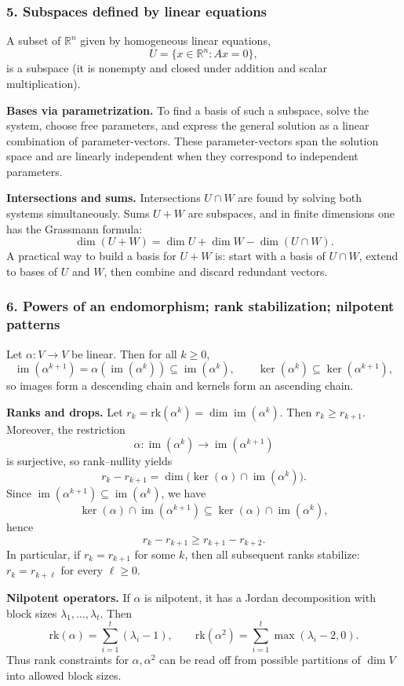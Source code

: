 \documentclass[12pt,a4paper]{article}
\theoremstyle{plain}
\theoremstyle{definition}      %
\begin{document}
\bigskip

\subsubsection*{5. Subspaces defined by linear equations}

A subset of $\mathbb R^n$ given by homogeneous linear equations,
\[
U=\{x\in\mathbb R^n:Ax=0\},
\]
is a subspace (it is nonempty and closed under addition and scalar multiplication).

\medskip
\noindent\textbf{Bases via parametrization.}
To find a basis of such a subspace, solve the system, choose free parameters, and express the general solution as
a linear combination of parameter-vectors. These parameter-vectors span the solution space and are linearly independent
when they correspond to independent parameters.

\medskip
\noindent\textbf{Intersections and sums.}
Intersections $U\cap W$ are found by solving both systems simultaneously. Sums $U+W$ are subspaces, and in finite
dimensions one has the Grassmann formula:
\[
\dim(U+W)=\dim U+\dim W-\dim(U\cap W).
\]
A practical way to build a basis for $U+W$ is: start with a basis of $U\cap W$, extend to bases of $U$ and $W$, then
combine and discard redundant vectors.

\bigskip

\subsubsection*{6. Powers of an endomorphism; rank stabilization; nilpotent patterns}

Let $\alpha:V\to V$ be linear. Then for all $k\ge 0$,
\[
\operatorname{im}(\alpha^{k+1})=\alpha(\operatorname{im}(\alpha^k))\subseteq \operatorname{im}(\alpha^k),
\qquad
\ker(\alpha^k)\subseteq \ker(\alpha^{k+1}),
\]
so images form a descending chain and kernels form an ascending chain.

\medskip
\noindent\textbf{Ranks and drops.}
Let $r_k=\mathrm{rk}(\alpha^k)=\dim\operatorname{im}(\alpha^k)$. Then $r_k\ge r_{k+1}$.
Moreover, the restriction
\[
\alpha:\operatorname{im}(\alpha^k)\to \operatorname{im}(\alpha^{k+1})
\]
is surjective, so rank--nullity yields
\[
r_k-r_{k+1}=\dim\big(\ker(\alpha)\cap \operatorname{im}(\alpha^k)\big).
\]
Since $\operatorname{im}(\alpha^{k+1})\subseteq \operatorname{im}(\alpha^k)$, we have
\[
\ker(\alpha)\cap \operatorname{im}(\alpha^{k+1})
\subseteq
\ker(\alpha)\cap \operatorname{im}(\alpha^k),
\]
hence
\[
r_k-r_{k+1}\ge r_{k+1}-r_{k+2}.
\]
In particular, if $r_k=r_{k+1}$ for some $k$, then all subsequent ranks stabilize:
$r_k=r_{k+\ell}$ for every $\ell\ge 0$.

\medskip
\noindent\textbf{Nilpotent operators.}
If $\alpha$ is nilpotent, it has a Jordan decomposition with block sizes $\lambda_1,\dots,\lambda_t$.
Then
\[
\mathrm{rk}(\alpha)=\sum_{i=1}^t(\lambda_i-1),\qquad
\mathrm{rk}(\alpha^2)=\sum_{i=1}^t\max(\lambda_i-2,0).
\]
Thus rank constraints for $\alpha,\alpha^2$ can be read off from possible partitions of $\dim V$ into allowed block sizes.


	
\end{document}
